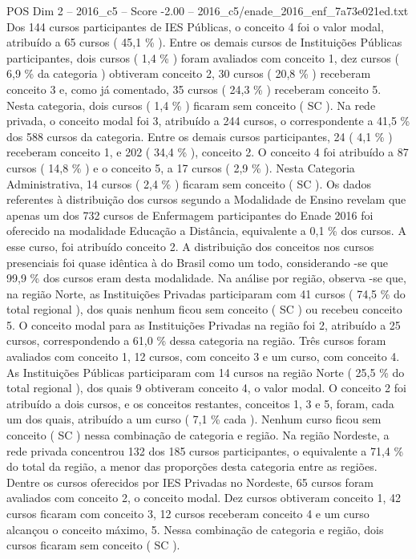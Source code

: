 \begin{textsample}{POS Dim 2 – 2016\_c5 – Score -2.00 – 2016\_c5/enade\_2016\_enf\_7a73e021ed.txt}
Dos 144 cursos participantes de IES Públicas, o conceito 4 foi o valor modal, atribuído a 65 cursos ( 45,1 \% ).
Entre os demais cursos de Instituições Públicas participantes, dois cursos ( 1,4 \% ) foram avaliados com conceito 1, dez cursos ( 6,9 \% da categoria ) obtiveram conceito 2, 30 cursos ( 20,8 \% ) receberam conceito 3 e, como já comentado, 35 cursos ( 24,3 \% ) receberam conceito 5.
Nesta categoria, dois cursos ( 1,4 \% ) ficaram sem conceito ( SC ).
Na rede privada, o conceito modal foi 3, atribuído a 244 cursos, o correspondente a 41,5 \% dos 588 cursos da categoria.
Entre os demais cursos participantes, 24 ( 4,1 \% ) receberam conceito 1, e 202 ( 34,4 \% ), conceito 2.
O conceito 4 foi atribuído a 87 cursos ( 14,8 \% ) e o conceito 5, a 17 cursos ( 2,9 \% ).
Nesta Categoria Administrativa, 14 cursos ( 2,4 \% ) ficaram sem conceito ( SC ).
Os dados referentes à distribuição dos cursos segundo a Modalidade de Ensino revelam que apenas um dos 732 cursos de Enfermagem participantes do Enade 2016 foi oferecido na modalidade Educação a Distância, equivalente a 0,1 \% dos cursos.
A esse curso, foi atribuído conceito 2.
A distribuição dos conceitos nos cursos presenciais foi quase idêntica à do Brasil como um todo, considerando -se que 99,9 \% dos cursos eram desta modalidade.
Na análise por região, observa -se que, na região Norte, as Instituições Privadas participaram com 41 cursos ( 74,5 \% do total regional ), dos quais nenhum ficou sem conceito ( SC ) ou recebeu conceito 5.
O conceito modal para as Instituições Privadas na região foi 2, atribuído a 25 cursos, correspondendo a 61,0 \% dessa categoria na região.
Três cursos foram avaliados com conceito 1, 12 cursos, com conceito 3 e um curso, com conceito 4.
As Instituições Públicas participaram com 14 cursos na região Norte ( 25,5 \% do total regional ), dos quais 9 obtiveram conceito 4, o valor modal.
O conceito 2 foi atribuído a dois cursos, e os conceitos restantes, conceitos 1, 3 e 5, foram, cada um dos quais, atribuído a um curso ( 7,1 \% cada ).
Nenhum curso ficou sem conceito ( SC ) nessa combinação de categoria e região.
Na região Nordeste, a rede privada concentrou 132 dos 185 cursos participantes, o equivalente a 71,4 \% do total da região, a menor das proporções desta categoria entre as regiões.
Dentre os cursos oferecidos por IES Privadas no Nordeste, 65 cursos foram avaliados com conceito 2, o conceito modal.
Dez cursos obtiveram conceito 1, 42 cursos ficaram com conceito 3, 12 cursos receberam conceito 4 e um curso alcançou o conceito máximo, 5.
Nessa combinação de categoria e região, dois cursos ficaram sem conceito ( SC ).

\end{textsample}
